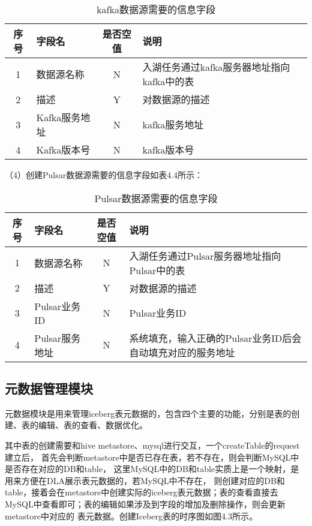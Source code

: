 \begin{table}[h]
  \centering
  \caption{kafka数据源需要的信息字段}
  \label{tab:exampletable}
  \begin{tabular}{clcl}
    \toprule
    序号  & 字段名     & 是否空值   & 说明                                      \\
    \midrule
    1    & 数据源名称  & N        & 入湖任务通过kafka服务器地址指向kafka中的表 \\
    2    & 描述       & Y        & 对数据源的描述                               \\
    3    & Kafka服务地址    & N        & kafka服务地址                           \\
    4    & Kafka版本号      & N        &  kafka版本号       \\
    \bottomrule
  \end{tabular}
\end{table}

（4）创建Pulsar数据源需要的信息字段如表4.4所示：

\begin{table}[h]
  \centering
  \caption{Pulsar数据源需要的信息字段}
  \label{tab:exampletable}
  \begin{tabular}{clcl}
    \toprule
    序号  & 字段名     & 是否空值   & 说明                                      \\
    \midrule
    1    & 数据源名称  & N        & 入湖任务通过Pulsar服务器地址指向Pulsar中的表 \\
    2    & 描述       & Y        & 对数据源的描述                               \\
    3    & Pulsar业务ID    & N        & Pulsar业务ID                          \\
    4    & Pulsar服务地址      & N        &  系统填充，输入正确的Pulsar业务ID后会自动填充对应的服务地址      \\
    \bottomrule
  \end{tabular}
\end{table}

\subsection{元数据管理模块}

元数据模块是用来管理iceberg表元数据的，包含四个主要的功能，分别是表的创建、表的编辑、表的查看、数据优化。

其中表的创建需要和hive metastore、mysql进行交互，一个createTable的request建立后，
首先会判断metastore中是否已存在表，若不存在，则会判断MySQL中是否存在对应的DB和table，
这里MySQL中的DB和table实质上是一个映射，是用来方便在DLA展示表元数据的，若MySQL中不存在，
则创建对应的DB和table，接着会在metastore中创建实际的iceberg表元数据；表的查看直接去
MySQL中查看即可；表的编辑如果涉及到字段的增加及删除操作，则会更新metastore中对应的
表元数据。创建Iceberg表的时序图如图4.3所示。

